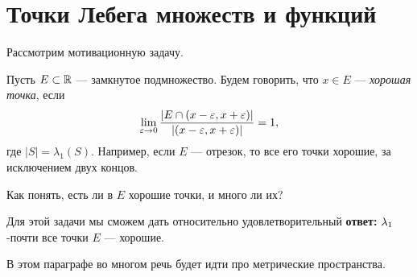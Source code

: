 \section{Точки Лебега множеств и функций}

Рассмотрим мотивационную задачу.

\begin{problem}
 \label{problem:motivatinal_problem_good_points_in_closed_subset}
 Пусть $E \subset \mathbb{R}$ --- замкнутое подмножество. Будем говорить, что $x \in E$ --- \textit{хорошая точка}, если \begin{align*}
  \lim_{\varepsilon \to 0} \frac{\left| E \cap (x - \varepsilon, x + \varepsilon) \right| }{\left| (x - \varepsilon, x + \varepsilon) \right|} = 1
 ,\end{align*} где $\left| S \right| = \lambda_1(S)$. Например, если $E$ --- отрезок, то все его точки хорошие, за исключением двух концов.

 Как понять, есть ли в $E$ хорошие точки, и много ли их?

 Для этой задачи мы сможем дать относительно удовлетворительный \textbf{ответ:} $\lambda_{1}$-почти все точки  $E$ --- хорошие.
\end{problem}

В этом параграфе во многом речь будет идти про метрические пространства. 

